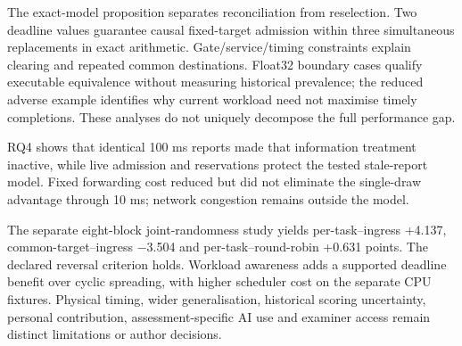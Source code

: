\documentclass[11pt,a4paper]{article}
\begin{document}
The exact-model proposition separates reconciliation from reselection. Two deadline values guarantee causal fixed-target admission within three simultaneous replacements in exact arithmetic. Gate/service/timing constraints explain clearing and repeated common destinations. Float32 boundary cases qualify executable equivalence without measuring historical prevalence; the reduced adverse example identifies why current workload need not maximise timely completions. These analyses do not uniquely decompose the full performance gap.

RQ4 shows that identical 100 ms reports made that information treatment inactive, while live admission and reservations protect the tested stale-report model. Fixed forwarding cost reduced but did not eliminate the single-draw advantage through 10 ms; network congestion remains outside the model.

The separate eight-block joint-randomness study yields per-task--ingress +4.137, common-target--ingress \ensuremath{-}3.504 and per-task--round-robin +0.631 points. The declared reversal criterion holds. Workload awareness adds a supported deadline benefit over cyclic spreading, with higher scheduler cost on the separate CPU fixtures. Physical timing, wider generalisation, historical scoring uncertainty, personal contribution, assessment-specific AI use and examiner access remain distinct limitations or author decisions.
\end{document}

